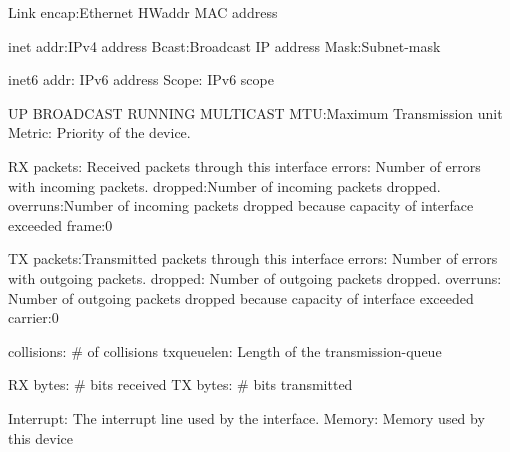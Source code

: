 Link encap:Ethernet  
HWaddr MAC address
          
inet addr:IPv4 address
Bcast:Broadcast IP address
Mask:Subnet-mask
          
inet6 addr: IPv6 address
Scope: IPv6 scope
          
UP BROADCAST RUNNING MULTICAST  
MTU:Maximum Transmission unit
Metric: Priority of the device.
          
RX packets: Received packets through this interface
errors: Number of errors with incoming packets.
dropped:Number of incoming packets dropped.
overruns:Number of incoming packets dropped because capacity of interface exceeded 
frame:0
          
TX packets:Transmitted packets through this interface 
errors: Number of errors with outgoing packets. 
dropped: Number of outgoing packets dropped.
overruns: Number of outgoing packets dropped because capacity of interface exceeded 
carrier:0
          
collisions: # of collisions
txqueuelen: Length of the transmission-queue 
          
RX bytes: # bits received
TX bytes: # bits transmitted
          
Interrupt: The interrupt line used by the interface.
Memory: Memory used by this device
